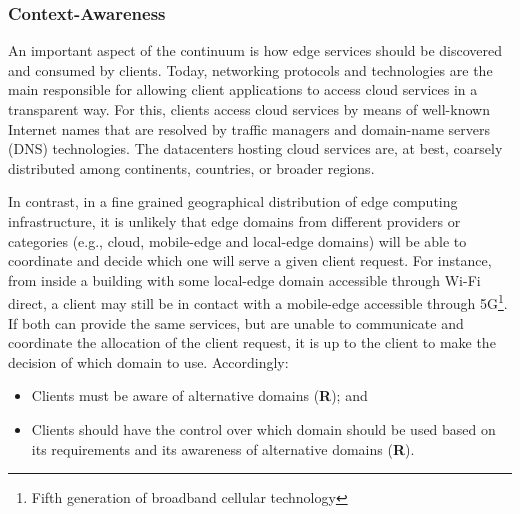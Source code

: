 \subsubsection{Context-Awareness}



An important aspect of the continuum is how edge services should be discovered and consumed by clients. Today, networking protocols and technologies are the main responsible for allowing client applications to access cloud services in a transparent way. For this, clients access cloud services by means of well-known Internet names that are resolved by traffic managers and domain-name servers (DNS) technologies. The datacenters hosting cloud services are, at best, coarsely distributed among continents, countries, or broader regions. 

In contrast, in a fine grained geographical distribution of edge computing infrastructure, it is unlikely that edge domains from different providers or categories (e.g., cloud, mobile-edge and local-edge domains) will be able to coordinate and decide which one will serve a given client request. For instance, from inside a building with some local-edge domain accessible through Wi-Fi direct, a client may still be in contact with a mobile-edge accessible through 5G\footnote{Fifth generation of broadband cellular technology}. If both can provide the same services, but are unable to communicate and coordinate the allocation of the client request, it is up to the client to make the decision of which domain to use. Accordingly:

\begin{itemize}
	
	\item Clients must be aware of alternative domains (\textbf{R}); and
	
	\item Clients should have the control over which domain should be used based on its requirements and its awareness of alternative domains (\textbf{R}).
	
\end{itemize}


